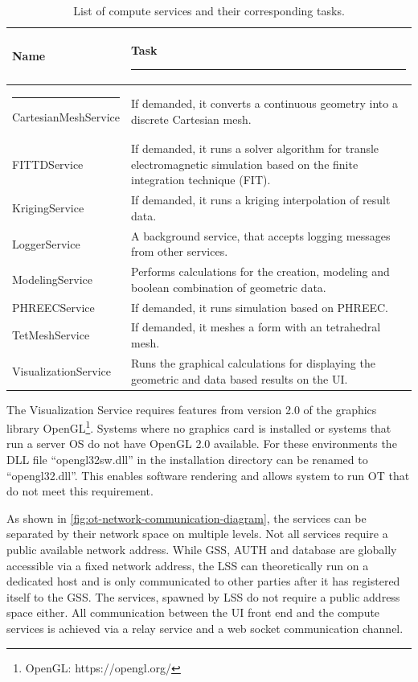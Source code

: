 \begin{table}[h!]
	\centering
	\begin{tabular}{|l | p{}|} 
		\hline
		\bfseries Name & \bfseries Task  \rule{-5pt}{2.6ex} \\
		\hline \rule{-3pt}{3ex}
		CartesianMeshService & If demanded, it converts a continuous geometry into a discrete Cartesian mesh. \\
		FITTDService & If demanded, it runs a solver algorithm for transle electromagnetic simulation based on the finite integration technique (FIT).\\
		KrigingService & If demanded, it runs a kriging interpolation of result data. \\ 
		LoggerService & A background service, that accepts logging messages from other services. \\ 
		ModelingService & Performs calculations for the creation, modeling and boolean combination of geometric data. \\ 
		PHREECService & If demanded, it runs simulation based on PHREEC. \\ 
		TetMeshService & If demanded, it meshes a form with an tetrahedral mesh.  \\ 
		VisualizationService & Runs the graphical calculations for displaying the geometric and data based results on the \ac{UI}.\\ 
		[1ex] 
		\hline
	\end{tabular}
	\caption{List of compute services and their corresponding tasks.}
	\label{tbl:ot-compute-services}
\end{table}

The Visualization Service requires features from version 2.0 of the graphics library OpenGL\footnote{OpenGL: https://opengl.org/}. Systems where no graphics card is installed or systems that run a server \ac{OS} do not have OpenGL 2.0 available. For these environments the \ac{DLL} file \enquote{opengl32sw.dll} in the installation directory can be renamed to \enquote{opengl32.dll}. This enables software rendering and allows system to run \ac{OT} that do not meet this requirement.

As shown in \autoref{fig:ot-network-communication-diagram}, the services can be separated by their network space on multiple levels. Not all services require a public available network address.
While \ac{GSS}, \ac{AUTH} and database are globally accessible via a fixed network address, the \ac{LSS} can theoretically run on a dedicated host and is only communicated to other parties after it has registered itself to the \ac{GSS}. The services, spawned by \ac{LSS} do not require a public address space either. All communication between the \ac{UI} front end and the compute services is achieved via a relay service and a web socket communication channel.

